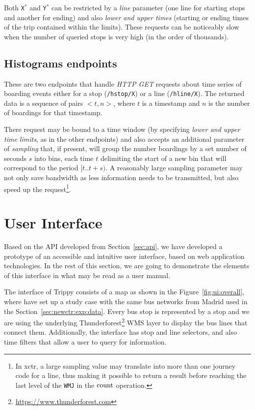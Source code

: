     Both \texttt{X$^*$} and \texttt{Y$^*$} can be restricted by a \textit{line} parameter (one line for starting stops and another for ending) and also \textit{lower and upper times} (starting or ending times of the trip contained within the limits). These requests can be noticeably slow when the number of queried stops is very high (in the order of thousands).
    
    \subsection{Histograms endpoints}
    These are two endpoints that handle {\em HTTP GET} requests about time series of boarding events either for a stop (\texttt{/hstop/X}) or a line (\texttt{/hline/X}). The returned data is a sequence of pairs $<t,n>$, where $t$ is a timestamp and $n$ is the number of boardings for that timestamp.
    
    There request may be bound to a time window (by specifying \textit{lower and upper time limits}, as in the other endpoints) and also accepts an additional parameter of \textit{sampling} that, if present, will group the number boardings by a set number of seconds $s$ into bins, each time $t$ delimiting the start of a new bin that will correspond to the period $[t..t+s)$. A reasonably large sampling parameter may not only save bandwidth as less information needs to be transmitted, but also speed up the request\footnote{In \gls{xctr}, a large sampling value may translate into more than one journey code for a line, thus making it possible to return a result before reaching the last level of the \texttt{WMJ} in the $\operatorname{count}$ operation.}.
	
	\section{User Interface}
	\label{sec:ui}
	Based on the API developed from Section~\ref{sec:api}, we have developed a prototype of an accessible and intuitive user interface, based on web application technologies. In the rest of this section, we are going to demonstrate the elements of this interface in what may be read as a user manual.
	
    The interface of Trippy consists of a map as shown in the Figure~\ref{fig:ui:overall}, where have set up a study case with the same bus networks from Madrid used in the Section~\ref{sec:newctr:exp:data}. Every bus stop is represented by a stop and we are using the underlying Thunderforest\footnote{\url{https://www.thunderforest.com}} WMS layer to display the bus lines that connect them. Additionally, the interface has stop and line selectors, and also time filters that allow a user to query for information.
    
